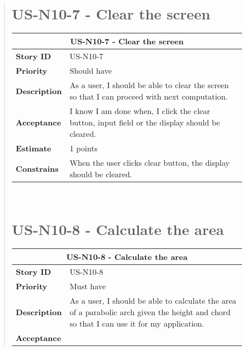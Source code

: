 \documentclass[12pt]{report}
\begin{document}
\begin{quote}
              \section{US-N10-7 - Clear the screen}
                \begin{tabular}{ |p{4cm}|p{10cm}| }
                 \hline
                 \multicolumn{2}{|c|}{\textbf{US-N10-7 - Clear the screen} } \\
                 \hline
                 \textbf {Story ID}& US-N10-7  \\
                 \hline
                 \textbf{Priority} & Should have \\
                 \hline
                 \textbf{Description}   &As a user, I should be able to clear the screen so that I can proceed with next computation.\\
                 \hline
                 \textbf{Acceptance}& 
                
               I know I am done when, I click the clear button, input field or the display should be cleared. \\
                 \hline
                 \textbf{Estimate} &  1 points  \\
                 \hline
                 \textbf{Constrains}&  When the user clicks clear button, the display should be cleared.   \\
                 \hline
                \end{tabular}
            \hfill\break\\
            
        
        
        
             
        
              \section{US-N10-8 - Calculate the area }
                \begin{tabular}{ |p{4cm}|p{10cm}| }
                 \hline
                 \multicolumn{2}{|c|}{\textbf{US-N10-8 - Calculate the area} } \\
                 \hline
                 \textbf {Story ID}& US-N10-8  \\
                 \hline
                 \textbf{Priority} & Must have \\
                 \hline
                 \textbf{Description}   &As a user, I should be able to calculate the area of a parabolic arch given the height and chord so that I can use it for my application.\\
                 \hline
                 \textbf{Acceptance}& 
                

\end{tabular}
\end{quote}
\end{document}
